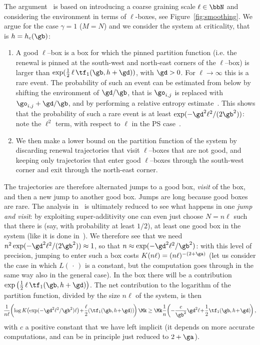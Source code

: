 The argument~\cite{cf:GT06} is based on introducing a coarse graining scale $\ell \in \bbN$ and considering the environment in terms of $\ell$-boxes, see Figure~\ref{fig:smoothing}. We argue for the case $\gamma=1$ ($M=N$) and we consider the system at criticality, that is $h=h_c(\gb)$:
\begin{enumerate}
\item A good $\ell$--box is a box for which the pinned partition function (i.e. the renewal is pinned at the south-west and north-east corners of the $\ell$--box) is larger than $\exp(\tfrac12\,\ell\,\tf_1(\gb, h+ \gd))$, with $\gd>0$. For $\ell\to \infty$ this is a rare event. The probability of such an event can be estimated from below by shifting the environment of $\gd/\gb$, that is $\go_{i,j}$ is replaced with $\go_{i,j}+ \gd/\gb$, and by performing a relative entropy estimate~\cite[Chapter~5]{cf:G}. This shows that the probability of such a rare event is at least $\exp(-\gd^2 \ell^2 /(2 \gb^2))$: note the $\ell^2$ term, with respect to $\ell$ in the PS case~\cite{cf:GT06}.
\item We then make a lower bound on the partition function of the system by discarding renewal trajectories that visit $\ell$--boxes that are not good, and keeping only trajectories that enter good $\ell$--boxes through the south-west corner and exit through the north-east corner.
\end{enumerate}


The trajectories are therefore alternated jumps to a good box, \emph{visit} of the box, and then a new jump to another good box. Jumps are long because good boxes are rare. The analysis in~\cite{cf:GT06} is ultimately reduced to see what happens in one \emph{jump and visit}: by exploiting super-additivity one can even just choose $N=n\ell$ such that there is (say, with probability at least $1/2$), at least one good box in the system (like it is done in~\cite{cf:BL11}). We therefore see that we need $n^2 \exp(-\gd^2 \ell^2 /(2 \gb^2))\approx 1$, so that $n \approx \exp(-\gd^2 \ell^2 / \gb^2)$: with this level of precision, jumping to enter such a box costs $K(n\ell) = (n\ell)^{-(2+\ga)}$ (let us consider the case in which $L({\,\cdot\,})$ is a constant, but the computation goes through in the same way also in the general case). In the box there will be a contribution $\exp\big(\tfrac12\,\ell\,\tf_1(\gb, h+ \gd) \big)$. The net contribution to the logarithm of the partition function, divided by the size $n\ell$ of the system, is then
\begin{equation}
\!\frac{1}{n \ell} \!\left(\log K\!\left(\exp(-\gd^2 \ell^2 / \gb^2) \ell \right)\!+\! \frac{\ell}{2} (\tf_1(\gb, h\!+\! \gd))\! \right) \Mk\ge\Mk \frac {1}{n} \!\left(-\frac{c}{\gb^2}\gd^2 \ell\!+\! \frac{1}{2} \tf_1(\gb, h\!+\! \gd)\! \right),\!
\end{equation}
with $c$ a positive constant that we have left implicit (it depends on more accurate computations, and can be in principle just reduced to $2+ \ga$).

